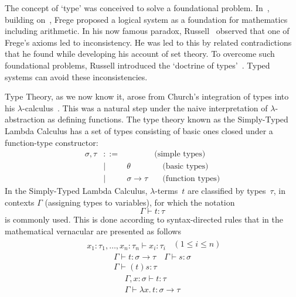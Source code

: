 \documentclass[11pt,twocolumn]{article}
\newcommand{\lcalculus}{\mbox{$\lambda$-calculus}}
\begin{document}
The concept of `type' was conceived to solve a foundational problem.
In~\cite{Frege1903}, building on~\cite{Frege1879}, Frege proposed a logical
system as a foundation for mathematics including arithmetic.  In his now
famous paradox, Russell~\cite{Russell1902} observed that one of Frege's axioms
led to inconsistency.  He was led to this %
by related contradictions that he found while developing his account of
set theory.  To overcome such foundational problems, Russell introduced
the `doctrine of types'~\cite[Appendix~B]{Russell1903}.  Typed systems can
avoid these inconsistencies.

Type Theory, as we now know it, arose from Church's integration of types into
his \lcalculus~\cite{Church1940}.  This was a natural step under the naive
interpretation of \mbox{$\lambda$-abstraction} as defining functions.  The
type theory known as the Simply-Typed Lambda Calculus has a set of types
consisting of basic ones closed under a function-type constructor:
  \[\begin{array}{rcll}
    \sigma,\tau & ::= & & \mbox{(simple types)}\\
    & \mid & \theta & \quad\mbox{(basic types)}\\
    & \mid & \sigma\to\tau & \quad\mbox{(function types)}
  \end{array}\]
In the Simply-Typed Lambda
Calculus, \mbox{$\lambda$-terms}~$t$ are classified by types~$\tau$, in
contexts $\Gamma$ (assigning types to variables), for which the notation
  \[
  \Gamma\vdash t:\tau
\]
is commonly used.  This is done according to syntax-directed rules that in the
mathematical vernacular are presented as follows
  \[
  \begin{array}{c}
    \\ \hline
    x_1:\tau_1,\ldots,x_n:\tau_n\vdash x_i:\tau_i
  \end{array}
  \enspace(1\leq i\leq n)
\]
  \[\begin{array}{c}
    \Gamma\vdash t:\sigma\to\tau
    \quad 
    \Gamma\vdash s:\sigma
    \\ \hline
    \Gamma\vdash (t)s:\tau
\end{array}\]
\vspace*{-2mm}
  \begin{equation}\label{LambdaAbstraction} 
  \begin{array}{c}
    \Gamma,x:\sigma\vdash t:\tau
    \\ \hline
    \Gamma\vdash\lambda x.\,t:\sigma\to\tau
  \end{array}
\end{equation}
\vspace*{-2mm}
\end{document}
